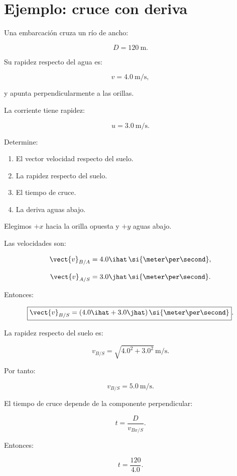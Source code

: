 \section{Ejemplo: cruce con deriva}

\begin{ejemplo}

Una embarcación cruza un río de ancho:

\[
D=\SI{120}{\meter}.
\]

Su rapidez respecto del agua es:

\[
v=\SI{4.0}{\meter\per\second},
\]

y apunta perpendicularmente a las orillas.

La corriente tiene rapidez:

\[
u=\SI{3.0}{\meter\per\second}.
\]

Determine:

\begin{enumerate}[label=\alph*)]
    \item El vector velocidad respecto del suelo.
    \item La rapidez respecto del suelo.
    \item El tiempo de cruce.
    \item La deriva aguas abajo.
\end{enumerate}

\end{ejemplo}

Elegimos \(+x\) hacia la orilla opuesta
y \(+y\) aguas abajo.

Las velocidades son:

\[
\vect{v}_{B/A}
=
4.0\ihat\,
\si{\meter\per\second},
\]

\[
\vect{v}_{A/S}
=
3.0\jhat\,
\si{\meter\per\second}.
\]

Entonces:

\[
\boxed{
\vect{v}_{B/S}
=
(4.0\ihat+3.0\jhat)
\,\si{\meter\per\second}
}.
\]

La rapidez respecto del suelo es:

\[
v_{B/S}
=
\sqrt{4.0^2+3.0^2}\,
\si{\meter\per\second}.
\]

Por tanto:

\[
\boxed{
v_{B/S}=\SI{5.0}{\meter\per\second}
}.
\]

El tiempo de cruce depende de la componente
perpendicular:

\[
t=\frac{D}{v_{Bx/S}}.
\]

Entonces:

\[
t=\frac{120}{4.0}.
\]

